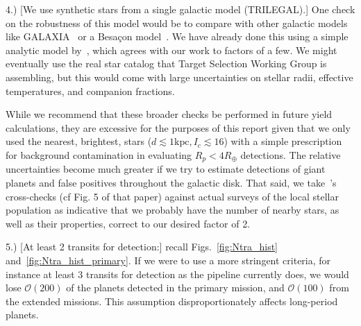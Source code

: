 \begin{description}
	
	\item 4.) [We use synthetic stars from a single galactic model (TRILEGAL).]
	One check on the robustness of this model would be to compare with other galactic models like GALAXIA~\citep{sharma_galaxia_2011} or a Besa\c con model~\citep{robin2003synthetic}.
	We have already done this using a simple analytic model by~\citet{winn_searchable_2013}, which agrees with our work to factors of a few.
	We might eventually use the real star catalog that \tesss Target Selection Working Group is assembling, but this would come with large uncertainties on stellar radii, effective temperatures, and companion fractions.
	
	While we recommend that these broader checks be performed in future \tess yield calculations, they are excessive for the purposes of this report given that we only used the nearest, brightest, stars ($d\lesssim\mathrm{1kpc}, I_c\lesssim16$) with a simple prescription for background contamination in evaluating \tesss $R_p<4R_\oplus$ detections.
	The relative uncertainties become much greater if we try to estimate detections of giant planets and false positives throughout the galactic disk.
	That said, we take~'s cross-checks (cf Fig. 5 of that paper) against actual surveys of the local stellar population as indicative that we probably have the number of nearby stars, as well as their properties, correct to our desired factor of 2.
	
	\item 5.) [At least 2 transits for detection:] recall Figs.~\ref{fig:Ntra_hist} and~\ref{fig:Ntra_hist_primary}.
	If we were to use a more stringent criteria, for instance at least 3 transits for detection as the \kepler pipeline currently does, we would lose $\mathcal{O}(200)$ of the planets detected in the primary mission, and $\mathcal{O}(100)$ from the extended missions.
	This assumption disproportionately affects long-period planets.
	
	

\end{description}

